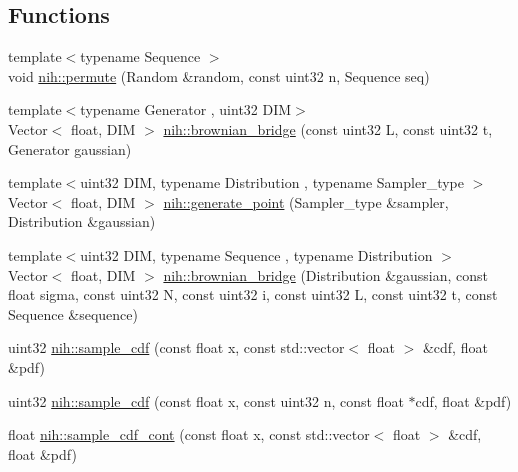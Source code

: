 \subsection*{\-Functions}
\begin{DoxyCompactItemize}
\item 
{\footnotesize template$<$typename Sequence $>$ }\\void \hyperlink{group__sampling_gafa69bcf9de5f02f4e1b33f60c6f33db9}{nih\-::permute} (\-Random \&random, const uint32 n, \-Sequence seq)
\item 
{\footnotesize template$<$typename Generator , uint32 \-D\-I\-M$>$ }\\\-Vector$<$ float, \-D\-I\-M $>$ \hyperlink{group__sampling_gabb2dd2ed5d619ca9c891ed4ce050fa6a}{nih\-::brownian\-\_\-bridge} (const uint32 \-L, const uint32 t, \-Generator gaussian)
\item 
{\footnotesize template$<$uint32 \-D\-I\-M, typename Distribution , typename Sampler\-\_\-type $>$ }\\\-Vector$<$ float, \-D\-I\-M $>$ \hyperlink{group__sampling_ga1e80545c2d9cb0ccdc535bd7bbc6b003}{nih\-::generate\-\_\-point} (\-Sampler\-\_\-type \&sampler, \-Distribution \&gaussian)
\item 
{\footnotesize template$<$uint32 \-D\-I\-M, typename Sequence , typename Distribution $>$ }\\\-Vector$<$ float, \-D\-I\-M $>$ \hyperlink{group__sampling_gadd2480f0c83af4a386b888ed7ed8e955}{nih\-::brownian\-\_\-bridge} (\-Distribution \&gaussian, const float sigma, const uint32 \-N, const uint32 i, const uint32 \-L, const uint32 t, const \-Sequence \&sequence)
\item 
uint32 \hyperlink{group__sampling_ga7f85d8d007bbaa744e558171b0064b8e}{nih\-::sample\-\_\-cdf} (const float x, const std\-::vector$<$ float $>$ \&cdf, float \&pdf)
\item 
uint32 \hyperlink{group__sampling_gae3dbf9f72ee99070878574ef9543785e}{nih\-::sample\-\_\-cdf} (const float x, const uint32 n, const float $\ast$cdf, float \&pdf)
\item 
float \hyperlink{group__sampling_ga2ba33066ab272bd8b90be1046198a124}{nih\-::sample\-\_\-cdf\-\_\-cont} (const float x, const std\-::vector$<$ float $>$ \&cdf, float \&pdf)
\end{DoxyCompactItemize}


